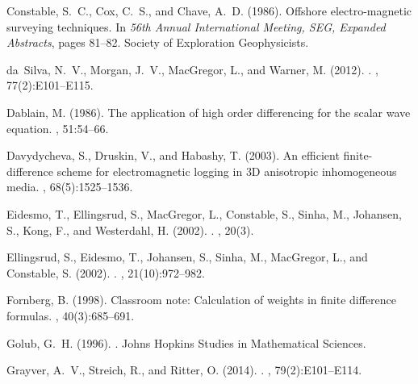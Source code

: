 \documentclass[a4paper,10pt]{article}
\begin{document}
\begin{thebibliography}{}
Constable, S.~C., Cox, C.~S., and Chave, A.~D. (1986).
\newblock Offshore electro-magnetic surveying techniques.
\newblock In {\em 56th Annual International Meeting, SEG, Expanded Abstracts},
  pages 81--82. Society of Exploration Geophysicists.

da~Silva, N.~V., Morgan, J.~V., MacGregor, L., and Warner, M. (2012).
.
, 77(2):E101--E115.

Dablain, M. (1986).
\newblock The application of high order differencing for the scalar wave
  equation.
, 51:54--66.

Davydycheva, S., Druskin, V., and Habashy, T. (2003).
\newblock An efficient finite-difference scheme for electromagnetic logging in
  {3D} anisotropic inhomogeneous media.
, 68(5):1525--1536.

Eidesmo, T., Ellingsrud, S., MacGregor, L., Constable, S., Sinha, M., Johansen,
  S., Kong, F., and Westerdahl, H. (2002).
.
, 20(3).

Ellingsrud, S., Eidesmo, T., Johansen, S., Sinha, M., MacGregor, L., and
  Constable, S. (2002).
.
, 21(10):972--982.

Fornberg, B. (1998).
\newblock Classroom note: Calculation of weights in finite difference formulas.
, 40(3):685--691.

Golub, G.~H. (1996).
.
\newblock Johns Hopkins Studies in Mathematical Sciences.

Grayver, A.~V., Streich, R., and Ritter, O. (2014).
.
, 79(2):E101--E114.


\end{thebibliography}
\end{document}
